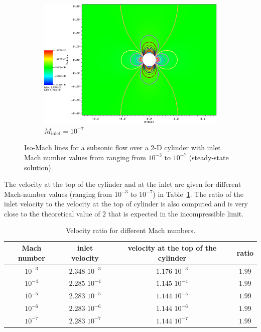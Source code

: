 \documentclass[preprint,10pt]{elsarticle}
\newcommand{\tbl}[1]{Table~\ref{#1}}                     %
\begin{document}
\begin{figure}[H]
        \begin{subfigure}[b]{0.495\textwidth}
                \centering
                \includegraphics[width=\textwidth]{CylinderMach1em7ZoomIn.png}
                \caption{$M_{\text{inlet}}=10^{-7}$}
                \label{fig:cyl_1em7}
        \end{subfigure}
        \caption{Iso-Mach lines for a subsonic flow over a 2-D cylinder with inlet Mach number values from ranging from $10^{-3}$ to $10^{-7}$ (steady-state solution).}
				\label{fig:cylinder}
\end{figure}
%
The velocity at the top of the cylinder and at the inlet are given for different Mach-number values (ranging from $10^{-3}$ to $10^{-7}$) in \tbl{tbl:velocity_ratio}. The ratio of the inlet velocity to the velocity at the top of cylinder is also computed and is very close to the theoretical value of $2$ that is expected in the incompressible limit.
%
\begin{table}[H]
\begin{center}
 \caption{\label{tbl:velocity_ratio}Velocity ratio for different Mach numbers.}
\begin{tabular}{|c|c|c|c|}
\hline
Mach number & inlet velocity & velocity at the top of the cylinder & ratio \\ \hline
$10^{-3}$ & $2.348$ $10^{-3}$ & $1.176$ $10^{-3}$& $1.99$  \\ \hline
$10^{-4}$ & $2.285$ $10^{-4}$ & $1.145$ $10^{-4}$& $1.99$  \\ \hline
$10^{-5}$ & $2.283$ $10^{-5}$ & $1.144$ $10^{-5}$ & $1.99$ \\ \hline
$10^{-6}$ & $2.283$ $10^{-6}$ & $1.144$ $10^{-6}$ & $1.99$ \\ \hline
$10^{-7}$ & $2.283$ $10^{-7}$ & $1.144$ $10^{-7}$ & $1.99$ \\ \hline
\end{tabular}
\end{center}
\nonumber
\end{table}
\end{document}
